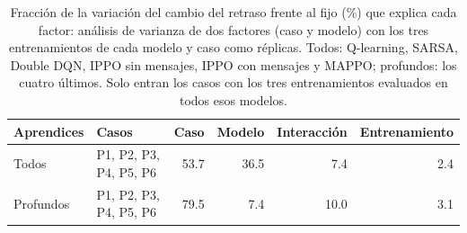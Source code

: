 \begin{table}[H]
\centering
\small
\begin{tabular}{llrrrr}
\toprule
Aprendices & Casos & Caso & Modelo & Interacción & Entrenamiento \\
\midrule
Todos & P1, P2, P3, P4, P5, P6 & 53.7 & 36.5 & 7.4 & 2.4 \\
Profundos & P1, P2, P3, P4, P5, P6 & 79.5 & 7.4 & 10.0 & 3.1 \\
\bottomrule
\end{tabular}
\caption[De qué depende el resultado]{Fracción de la variación del cambio del retraso frente al fijo (\%) que explica cada factor: análisis de varianza de dos factores (caso y modelo) con los tres entrenamientos de cada modelo y caso como réplicas. Todos: Q-learning, SARSA, Double DQN, IPPO sin mensajes, IPPO con mensajes y MAPPO; profundos: los cuatro últimos. Solo entran los casos con los tres entrenamientos evaluados en todos esos modelos.}
\label{tab:plan2-anova}
\end{table}
